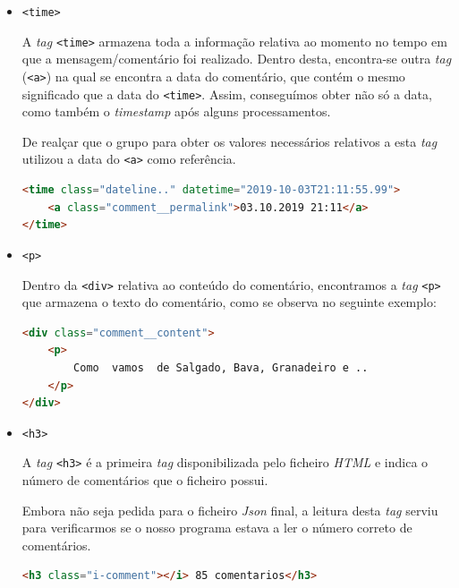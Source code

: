 \documentclass[a4paper,12pt]{report}
\newcommand*{\xml}[1]{\texttt{<#1>}}
\begin{document}
\vspace{5cm}

\begin{itemize}
    \item 
    \xml{time}
    \par A \textit{tag} \xml{time} armazena toda a informação relativa ao momento no tempo em que a mensagem/comentário foi realizado. Dentro desta, encontra-se outra \textit{tag} (\xml{a}) na qual se encontra a data do comentário, que contém o mesmo significado que a data do \xml{time}. Assim, conseguímos obter não só a data, como também o \textit{timestamp} após alguns processamentos.
    \par De realçar que o grupo para obter os valores necessários relativos a esta \textit{tag} utilizou a data do \xml{a} como referência.
    
        \begin{center}
\begin{lstlisting}[language = html]
<time class="dateline.." datetime="2019-10-03T21:11:55.99">
    <a class="comment__permalink">03.10.2019 21:11</a>
</time>
    \end{lstlisting}    
\end{center}    
\end{itemize}

\vspace{0.4cm}

\begin{itemize}
    \item 
    \xml{p}
    \par Dentro da \xml{div} relativa ao conteúdo do comentário, encontramos a \textit{tag} \xml{p} que armazena o texto do comentário, como se observa no seguinte exemplo:
    
            \begin{center}
\begin{lstlisting}[language = html]
<div class="comment__content">
    <p>
        Como  vamos  de Salgado, Bava, Granadeiro e ..
    </p>
</div>
    \end{lstlisting}
\end{center}    
\end{itemize}

\vspace{0.4cm}

\begin{itemize}
    \item 
    \xml{h3}
    \par A \textit{tag} \xml{h3} é a primeira \textit{tag} disponibilizada pelo ficheiro \textit{HTML} e indica o número de comentários que o ficheiro possui.
    \par Embora não seja pedida para o ficheiro \textit{Json} final, a leitura desta \textit{tag} serviu para verificarmos se o nosso programa estava a ler o número correto de comentários.


          \begin{center}
\begin{lstlisting}[language = html]
<h3 class="i-comment"></i> 85 comentarios</h3>
    \end{lstlisting}
\end{center}  
\end{itemize}
\end{document}
